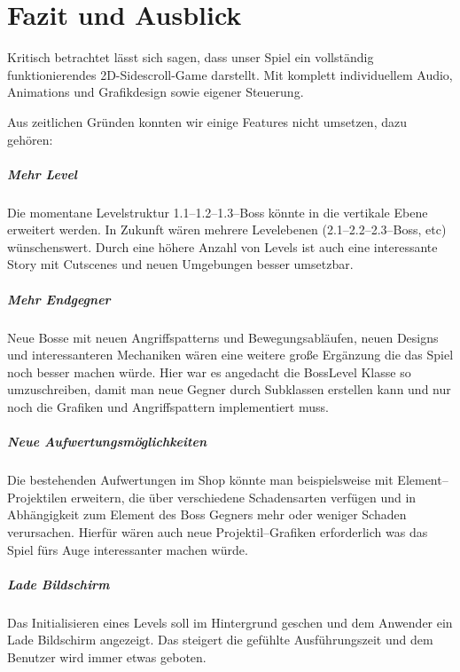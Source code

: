 \chapter{Fazit und Ausblick}\label{ch:fazit}

Kritisch betrachtet lässt sich sagen, dass unser Spiel ein vollständig funktionierendes 2D-Sidescroll-Game darstellt. Mit komplett individuellem Audio, Animations und Grafikdesign sowie eigener Steuerung. 

\label{sec:6_Features}

Aus zeitlichen Gründen konnten wir einige Features nicht umsetzen, dazu gehören:

\paragraph{Mehr Level}
Die momentane Levelstruktur 1.1--1.2--1.3--Boss könnte in die vertikale Ebene erweitert werden. In Zukunft wären mehrere Levelebenen (2.1--2.2--2.3--Boss, etc) wünschenswert. Durch eine höhere Anzahl von Levels ist auch eine interessante Story mit Cutscenes und neuen Umgebungen besser umsetzbar. 

\paragraph{Mehr Endgegner}
Neue Bosse mit neuen Angriffspatterns und Bewegungsabläufen, neuen Designs und interessanteren Mechaniken wären eine weitere große Ergänzung die das Spiel noch besser machen würde. Hier war es angedacht die BossLevel Klasse so umzuschreiben, damit man neue Gegner durch Subklassen erstellen kann und nur noch die Grafiken und Angriffspattern implementiert muss.

\paragraph{Neue Aufwertungsmöglichkeiten}
Die bestehenden Aufwertungen im Shop könnte man beispielsweise mit Element--Projektilen erweitern, die über verschiedene Schadensarten verfügen und in Abhängigkeit zum Element des Boss Gegners mehr oder weniger Schaden verursachen. Hierfür wären auch neue Projektil--Grafiken erforderlich was das Spiel fürs Auge interessanter machen würde.

\paragraph{Lade Bildschirm}
Das Initialisieren eines Levels soll im Hintergrund geschen und dem Anwender ein Lade Bildschirm angezeigt. Das steigert die gefühlte Ausführungszeit und dem Benutzer wird immer etwas geboten.

